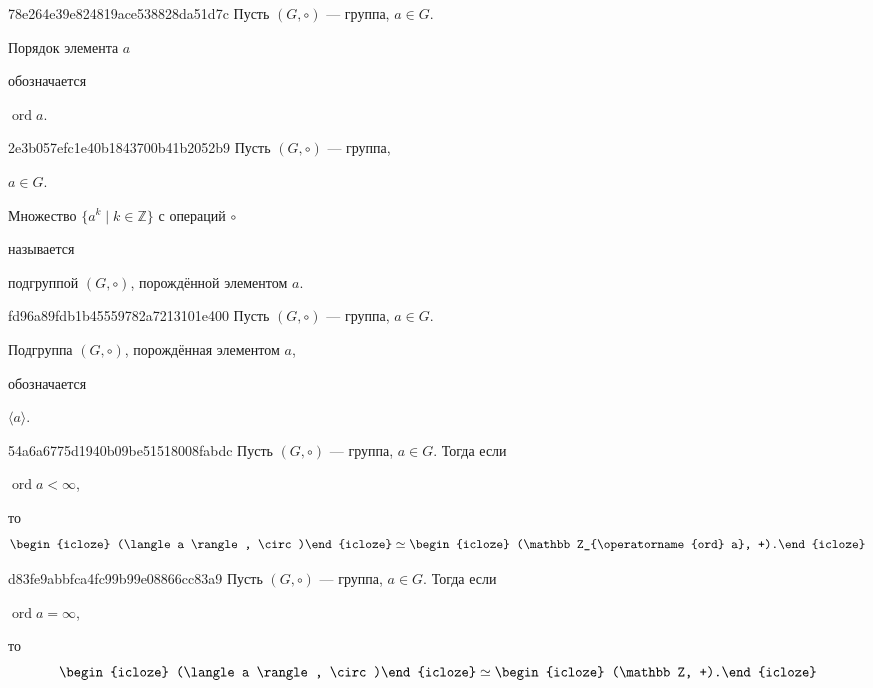 \begin{note}{78e264e39e824819ace538828da51d7c}
    Пусть \({ (G, \circ)}\) --- группа, \({ a \in G }\).
    \begin{icloze}{2}Порядок элемента \({ a }\)\end{icloze} обозначается \begin{icloze}{1}\({ \operatorname{ord} a }\).\end{icloze}
\end{note}

\begin{note}{2e3b057efc1e40b1843700b41b2052b9}
    Пусть \({ (G, \circ)}\) --- группа, \begin{icloze}{3}\({ a \in G }\).\end{icloze}
    \begin{icloze}{1}Множество \({ \{ a^{k} \mid k \in \mathbb Z \} }\) с операций \({ \circ }\)\end{icloze} называется \begin{icloze}{2}подгруппой \({ (G, \circ) }\), порождённой элементом \({ a }\).\end{icloze}
\end{note}

\begin{note}{fd96a89fdb1b45559782a7213101e400}
    Пусть \({ (G, \circ)}\) --- группа, \({ a \in G }\).
    \begin{icloze}{2}Подгруппа \({ (G, \circ) }\), порождённая элементом \({ a }\),\end{icloze} обозначается \begin{icloze}{1}\({ \langle a \rangle }\).\end{icloze}
\end{note}

\begin{note}{54a6a6775d1940b09be51518008fabdc}
    Пусть \({ (G, \circ)}\) --- группа, \({ a \in G }\).
    Тогда если \begin{icloze}{2}\({ \operatorname{ord} a < \infty }\),\end{icloze} то
    \[
        \begin{icloze}{3}(\langle a \rangle, \circ)\end{icloze} \simeq \begin{icloze}{1}(\mathbb Z_{\operatorname{ord} a}, +).\end{icloze}
    \]
\end{note}

\begin{note}{d83fe9abbfca4fc99b99e08866cc83a9}
    Пусть \({ (G, \circ)}\) --- группа, \({ a \in G }\).
    Тогда если \begin{icloze}{2}\({ \operatorname{ord} a = \infty }\),\end{icloze} то
    \[
        \begin{icloze}{3}(\langle a \rangle, \circ)\end{icloze} \simeq \begin{icloze}{1}(\mathbb Z, +).\end{icloze}
    \]
\end{note}

